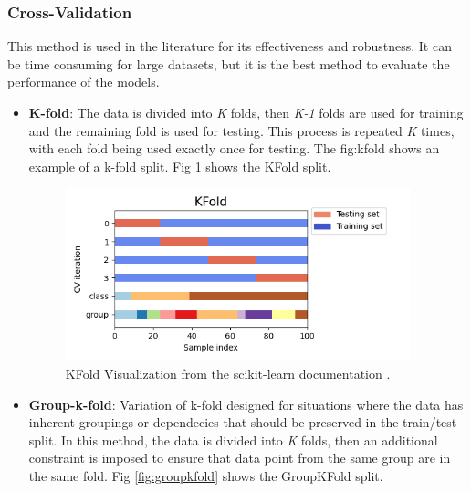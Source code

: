             \subsubsection{Cross-Validation}
                
                This method is used in the literature for its effectiveness and robustness. It can be time consuming for large datasets, but it is the best method to evaluate the performance of the models.

                \begin{itemize}

                    \item \textbf{K-fold}: The data is divided into \textit{K} folds, then \textit{K-1} folds are used for training and the remaining fold is used for testing. This process is repeated \textit{K} times, with each fold being used exactly once for testing. The fig:kfold shows an example of a k-fold split. Fig \ref{fig:kfold} shows the KFold split.
                    
                    \begin{figure}[H]
                        \centering
                        \includegraphics[width=\textwidth,height=5cm,keepaspectratio=true]{../src/resources/kfold.png}
                        \caption{
                          KFold Visualization from the scikit-learn documentation \cite{scikit-learn}.
                        }
                        \label{fig:kfold}
                    \end{figure}

                    \item \textbf{Group-k-fold}: Variation of k-fold designed for situations where the data has inherent groupings or dependecies that should be preserved in the train/test split. In this method, the data is divided into \textit{K} folds, then an additional constraint is imposed to ensure that data point from the same group are in the same fold. Fig \ref{fig:groupkfold} shows the GroupKFold split.
                    

\end{itemize}
